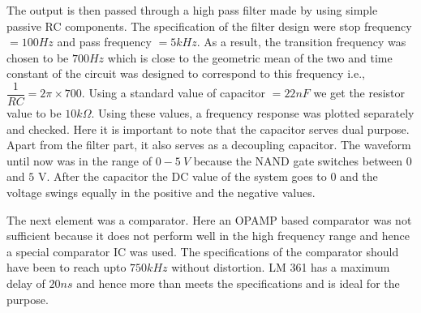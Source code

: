 \documentclass{article}
\begin{document}
The output is then passed through a high pass filter made by using simple passive RC components. The specification of the filter design were stop frequency $ = 100 Hz$ and pass frequency $ = 5 kHz $. As a result, the transition frequency was chosen to be $ 700 Hz $ which is close to the geometric mean of the two and time constant of the circuit was designed to correspond to this frequency i.e., $ \dfrac{1}{RC} = 2 \pi \times 700 $. Using a standard value of capacitor $ =  22 nF $ we get the resistor value to be $ 10 k \Omega $. Using these values, a frequency response was plotted separately and checked. Here it is important to note that the capacitor serves dual purpose. Apart from the filter part, it also serves as a decoupling capacitor. The waveform until now was in the range of $ 0-5 \  V $ because the NAND gate switches between $0$ and $5$ V. After the capacitor the DC value of the system goes to $0$ and the voltage swings equally in the positive and the negative values.

The next element was a comparator. Here an OPAMP based comparator was not sufficient because it does not perform well in the high frequency range and hence a special comparator IC was used. The specifications of the comparator should have been to reach upto $ 750 kHz $ without distortion. LM 361 has a maximum delay of $20 ns$ and hence more than meets the specifications and is ideal for the purpose.
\end{document}
